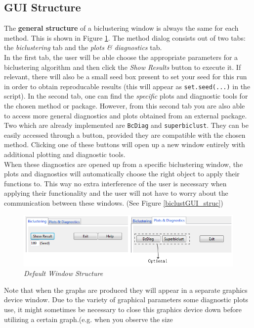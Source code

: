 \documentclass[a4paper]{article}\usepackage[]{graphicx}\usepackage[]{color}
\begin{document}
\subsection{GUI Structure}
The {\bf general structure} of a biclustering window is always 
the same for each method. This is shown in Figure \ref{def_str}. The
method dialog consists out of two tabs: the {\it biclustering} tab and the {\it
plots \& diagnostics} tab. \\
In the first tab, the user will be able choose the appropriate parameters for a
biclustering algorithm and then click the {\it Show Results} button to execute
it. If relevant, there will also be a small seed box present to set your seed
for this run in order to obtain reproducable results (this will appear as
\verb|set.seed(...)| in the script).
In the second tab, one can find the {\it specific} plots and diagnostic
tools for the chosen method or package. However, from this second tab you are also
able to access more general diagnostics and plots obtained from an external package. Two which are already
implemented are \verb|BcDiag| and \verb|superbiclust|. They can be easily
accessed through a button, provided they are compatible with the chosen method.
Clicking one of these buttons will open up a new window entirely with
additional plotting and diagnostic tools.\\
When these diagnostics are opened up from a specific biclustering window, the
plots and diagnostics will automatically choose the right object to apply their
functions to. This way no extra interference of the user is necessary when applying their
functionality and the user will not have to worry about the communication
between these windows. (See Figure \ref{biclustGUI_struc})
\begin{figure}[H]
\centering
\includegraphics[scale=0.5]{figures/standard_buttons.png}
\caption{{\it Default Window Structure}\label{def_str}}
\end{figure}
\noindent Note that when the graphs are produced they will appear in a separate
graphics device window. Due to the variety of graphical parameters some
diagnostic plots use, it might sometimes be necessary to close this graphics
device down before utilizing a certain graph.(e.g. when you observe the size
\end{document}
